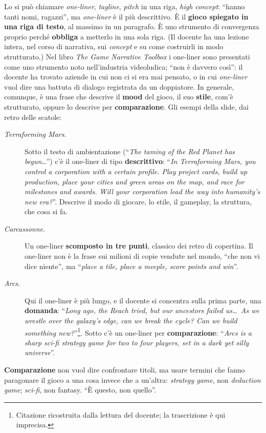Lo si può chiamare \emph{one-liner}, \emph{tagline}, \emph{pitch} in una riga, \emph{high
concept}: ``hanno tanti nomi, ragazzi'', ma \emph{one-liner} è il più descrittivo. È il
\textbf{gioco spiegato in una riga di testo}, al massimo in un paragrafo. È uno strumento di
convergenza proprio perché \textbf{obbliga} a metterlo in una sola riga. (Il docente ha
una lezione intera, nel corso di narrativa, sui \emph{concept} e su come costruirli in modo
strutturato.) Nel libro \emph{The Game Narrative Toolbox} i one-liner sono presentati come
uno strumento noto nell'industria videoludica; ``non è davvero così'': il docente ha
trovato aziende in cui non ci si era mai pensato, o in cui \emph{one-liner} vuol dire una
battuta di dialogo registrata da un doppiatore. In generale, comunque, è una frase che
descrive il \textbf{mood} del gioco, il suo \textbf{stile}, com'è strutturato, oppure lo
descrive per \textbf{comparazione}. Gli esempi della slide, dai retro delle scatole:
\begin{description}
  \item[\emph{Terraforming Mars}.] Sotto il testo di ambientazione (``\emph{The taming of
        the Red Planet has begun}\ldots'') c'è il one-liner di tipo
        \textbf{descrittivo}: ``\emph{In Terraforming Mars, you control a corporation with
        a certain profile. Play project cards, build up production, place your cities and
        green areas on the map, and race for milestones and awards. Will your corporation
        lead the way into humanity's new era?}''. Descrive il modo di giocare, lo stile, il
        gameplay, la struttura, che cosa si fa.
  \item[\emph{Carcassonne}.] Un one-liner \textbf{scomposto in tre punti}, classico dei
        retro di copertina. Il one-liner non è la frase sui milioni di copie vendute nel
        mondo, ``che non vi dice niente'', ma ``\emph{place a tile, place a meeple, score
        points and win}''.
  \item[\emph{Arcs}.] Qui il one-liner è più lungo, e il docente si concentra sulla prima
        parte, una \textbf{domanda}: ``\emph{Long ago, the Reach tried, but our ancestors
        failed us\ldots\ As we wrestle over the galaxy's edge, can we break the cycle? Can
        we build something new?}''\footnote{Citazione ricostruita dalla lettura del
        docente; la trascrizione è qui imprecisa.}. Sotto c'è un one-liner per
        \textbf{comparazione}: ``\emph{Arcs is a sharp sci-fi strategy game for two to four
        players, set in a dark yet silly universe}''.
\end{description}
\textbf{Comparazione} non vuol dire confrontare titoli, ma usare termini che fanno
paragonare il gioco a una cosa invece che a un'altra: \emph{strategy game}, non
\emph{deduction game}; \emph{sci-fi}, non fantasy. ``È questo, non quello''.

